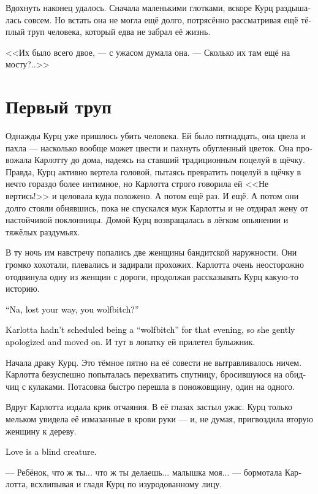 \documentclass[a4paper,12pt,fleqn]{book}\usepackage{cooltooltips}\usepackage{polyglossia}\setdefaultlanguage[babelshorthands=true]{russian}\setotherlanguage{english}\defaultfontfeatures{Ligatures=TeX,Mapping=tex-text} \usepackage{xcolor}\definecolor{lightgray}{HTML}{bbbbbb}\color{lightgray}\newcommand{\ml}[3]{\textenglish{\textcolor{black}{#3}}}
\begin{document}
Вдохнуть наконец удалось.
Сначала маленькими глотками, вскоре Курц раздышалась совсем.
Но встать она не могла ещё долго, потрясённо рассматривая ещё тёплый труп человека, который едва не забрал её жизнь.

<<Их было всего двое, --- с ужасом думала она.
--- Сколько их там ещё на мосту?..>>

\section{Первый труп}

Однажды Курц уже пришлось убить человека.
Ей было пятнадцать, она цвела и пахла --- насколько вообще может цвести и пахнуть обугленный цветок.
Она провожала Карлотту до дома, надеясь на ставший традиционным поцелуй в щёчку.
Правда, Курц активно вертела головой, пытаясь превратить поцелуй в щёчку в нечто гораздо более интимное, но Карлотта строго говорила ей <<Не вертись!>> и целовала куда положено.
А потом ещё раз.
И ещё.
А потом они долго стояли обнявшись, пока не спускался муж Карлотты и не отдирал жену от настойчивой поклонницы.
Домой Курц возвращалась в лёгком опьянении и тяжёлых раздумьях.

В ту ночь им навстречу попались две женщины бандитской наружности.
Они громко хохотали, плевались и задирали прохожих.
Карлотта очень неосторожно отодвинула одну из женщин с дороги, продолжая рассказывать Курц какую-то историю.

\ml{$0$}
{--- На, ты попутала, сука бирючья?}
{``Na, lost your way, you wolfbitch?''}

\ml{$0$}
{У Карлотты в планах на вечер не значилось становиться <<сукой бирючьей>>, поэтому она вежливо извинилась и пошла дальше.}
{Karlotta hadn't scheduled being a ``wolfbitch'' for that evening, so she gently apologized and moved on.}
И тут в лопатку ей прилетел булыжник.

Начала драку Курц.
Это тёмное пятно на её совести не вытравливалось ничем.
Карлотта безуспешно попыталась перехватить спутницу, бросившуюся на обидчиц с кулаками.
Потасовка быстро перешла в поножовщину, один на одного.

Вдруг Карлотта издала крик отчаяния.
В её глазах застыл ужас.
Курц только мельком увидела её измазанные в крови руки --- и, не думая, пригвоздила вторую женщину к дереву.

\ml{$0$}
{Любовь слепа.}
{Love is a blind creature.}

--- Ребёнок, что ж ты... что ж ты делаешь... малышка моя... --- бормотала Карлотта, всхлипывая и гладя Курц по изуродованному лицу.
\end{document}
